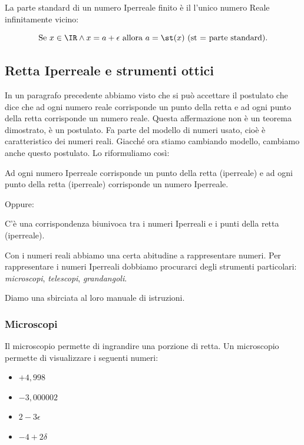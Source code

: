 \begin{definizione}
 La parte standard di un numero Iperreale finito è il l'unico numero Reale 
infinitamente vicino:

\[\text{Se } x \in \IR \wedge x= a+\epsilon \text{ allora } 
a= \st(x) \text{ (st = parte standard).}\]
\end{definizione}


\subsection{Retta Iperreale e strumenti ottici}
\label{subsec:insnum_retta}

In un paragrafo precedente abbiamo visto che si può accettare il postulato 
che 
dice che ad ogni numero reale corrisponde un punto della retta e ad ogni 
punto della retta corrisponde un numero reale. 
Questa affermazione non è un teorema dimostrato, è un postulato. Fa parte del 
modello
di numeri usato, cioè è caratteristico dei numeri reali. Giacché ora stiamo 
cambiando
modello, cambiamo anche questo postulato. Lo riformuliamo così:

\begin{postulato}
Ad ogni numero Iperreale corrisponde un punto della retta (iperreale) e ad 
ogni 
punto della retta (iperreale) corrisponde un numero Iperreale.
\end{postulato}

Oppure:

\begin{postulato}
C'è una corrispondenza biunivoca tra i numeri Iperreali e 
i punti della retta (iperreale).
\end{postulato}

Con i numeri reali abbiamo una certa abitudine a rappresentare numeri.
Per rappresentare i numeri Iperreali dobbiamo procurarci degli strumenti 
particolari: \emph{microscopi}, \emph{telescopi}, \emph{grandangoli}.

Diamo una sbirciata al loro manuale di istruzioni.

\subsubsection{Microscopi}
\label{subsec:insnum_microscopio}

Il microscopio permette di ingrandire una porzione di retta. 
Un microscopio permette di visualizzare i seguenti numeri:

\begin{multicols}{4}
\begin{itemize}[nosep]
 \item $+4,998$
 \item $-3,000002$
 \item $2-3\epsilon$
 \item $-4+2\delta$
\end{itemize}
\end{multicols}

